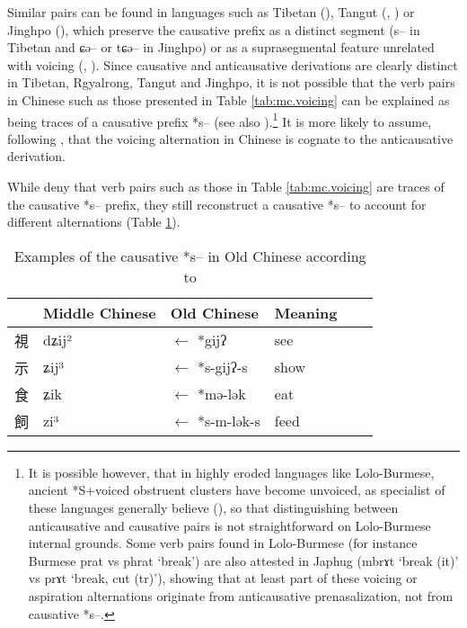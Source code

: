 \documentclass[oldfontcommands,oneside,a4paper,11pt]{article}
\newcommand{\ipa}[1]{{\phon \mbox{#1}}} %
\newcommand{\zh}[1]{{\cn #1}}
\begin{document}
Similar pairs can be found in languages such as Tibetan (\citealt{hill14voicing}), Tangut (\citealt{gong88alternations}, \citealt[245-8]{jacques14esquisse}) or Jinghpo (\citealt[78]{dai90yufa}), which preserve the causative prefix as a distinct segment (\ipa{s--} in Tibetan and \ipa{ɕə--} or \ipa{tɕə--} in Jinghpo) or as a suprasegmental feature unrelated with voicing (\citealt{gong99jinyuanyin}, \citealt[250-1]{jacques14esquisse}). Since causative and anticausative derivations are clearly distinct in Tibetan, Rgyalrong, Tangut and Jinghpo, it is not possible that the verb pairs in Chinese such as those presented in Table \ref{tab:mc.voicing} can be explained as being traces of a causative prefix *\ipa{s--} (see also \citealt{lapolla03}).\footnote{It is possible however, that in highly eroded languages like Lolo-Burmese, ancient *S+voiced obstruent clusters have become unvoiced, as specialist of these languages generally believe (\citealt{bradley79, gerner07caus}), so that distinguishing between anticausative and causative pairs is not straightforward on Lolo-Burmese internal grounds. Some verb pairs found in Lolo-Burmese (for instance Burmese \ipa{prat} vs \ipa{phrat} `break') are also attested in Japhug (\ipa{mbrɤt} `break (it)' vs \ipa{prɤt} `break, cut (tr)'), showing that at least part of these voicing or aspiration alternations originate from anticausative prenasalization, not from causative *\ipa{s--}.  } It is more likely to assume, following  \citet{sagart12sprefix}, that the voicing alternation in Chinese is cognate to the anticausative derivation.

While \citet{sagart12sprefix} deny that verb pairs such as those in Table \ref{tab:mc.voicing} are traces of the causative *\ipa{s--} prefix, they still reconstruct a causative *\ipa{s--} to account for different alternations (Table \ref{tab:caus.oc}).
   \begin{table}[h]
\caption{Examples of the causative *\ipa{s--} in Old Chinese according to \citet{sagart12sprefix}}\label{tab:caus.oc} \centering
\begin{tabular}{llllll}
\toprule
  &Middle Chinese  &Old Chinese &Meaning \\
  \midrule
  \zh{視}& \ipa{dʑij²} &$\leftarrow$ *\ipa{gijʔ}  & see \\
\zh{示}& \ipa{ʑij³} &$\leftarrow$ *\ipa{s-gijʔ-s}  & show \\
\zh{食}& \ipa{ʑik} &$\leftarrow$ *\ipa{mə-lək}  & eat \\
\zh{飼}& \ipa{zi³} &$\leftarrow$ *\ipa{s-m-lək-s}  & feed \\
\bottomrule
\end{tabular}
\end{table}
\end{document}
